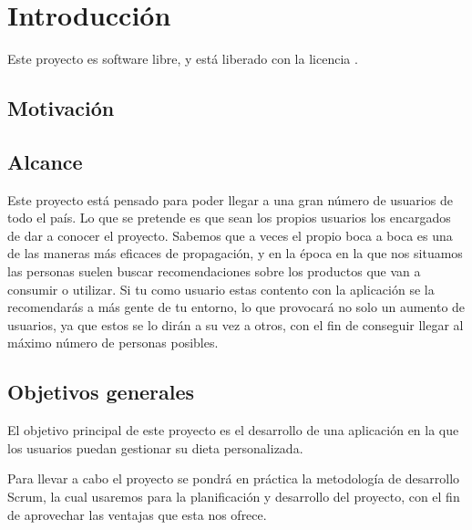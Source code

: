 \chapter{Introducción}

Este proyecto es software libre, y está liberado con la licencia \cite{gplv3}.

\section{Motivación}

\section{Alcance}

Este proyecto está pensado para poder llegar a una gran número de usuarios de todo el país. Lo que se pretende es que sean los propios usuarios los encargados de dar a conocer el proyecto. Sabemos que a veces el propio boca a boca es una de las maneras más eficaces de propagación, y en la época en la que nos situamos las personas suelen buscar recomendaciones sobre los productos que van a consumir o utilizar. Si tu como usuario estas contento con la aplicación se la recomendarás a más gente de tu entorno, lo que provocará no solo un aumento de usuarios, ya que estos se lo dirán a su vez a otros, con el fin de conseguir llegar al máximo número de personas posibles.

\section{Objetivos generales}

El objetivo principal de este proyecto es el desarrollo de una aplicación en la que los usuarios puedan gestionar su dieta personalizada.

Para llevar a cabo el proyecto se pondrá en práctica la metodología de desarrollo Scrum, la cual usaremos para la planificación y desarrollo del proyecto, con el fin de aprovechar las ventajas que esta nos ofrece.

